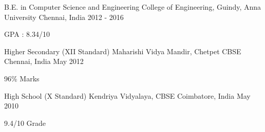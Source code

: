 

\begin{cventries}

  \cventry
    {B.E. in Computer Science and Engineering} %
    {College of Engineering, Guindy, Anna University} %
    {Chennai, India} %
    {2012 - 2016} %
    {
      \begin{cvitems} %
        \item {GPA : 8.34/10}
      \end{cvitems}
    }
  \vspace{-2mm}
  \cventry
    {Higher  Secondary  (XII  Standard)} %
    {Maharishi  Vidya  Mandir, Chetpet CBSE} %
    {Chennai, India} %
    {May 2012} %
    {
      \begin{cvitems} %
        \item {96\% Marks}
      \end{cvitems}
    }
  \vspace{-2mm}
  \cventry
    {High  School  (X  Standard)} %
    {Kendriya  Vidyalaya, CBSE} %
    {Coimbatore, India} %
    {May 2010} %
    {
      \begin{cvitems} %
        \item {9.4/10 Grade}
      \end{cvitems}
    }
\end{cventries}